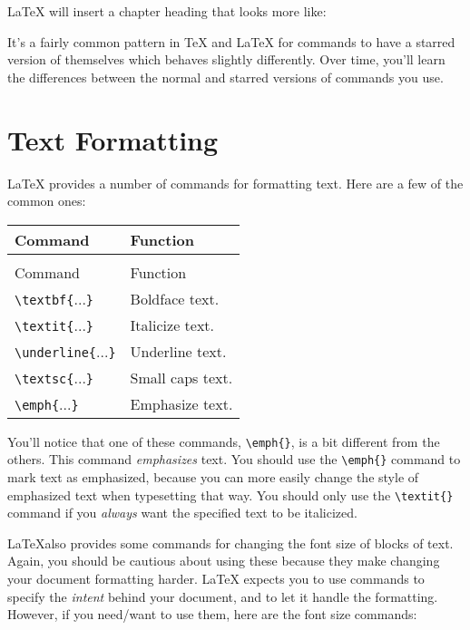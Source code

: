 
\LaTeX{} will insert a chapter heading that looks more like:


It's a fairly common pattern in \TeX{} and \LaTeX{} for commands to have a starred
version of themselves which behaves slightly differently. Over time, you'll
learn the differences between the normal and starred versions of commands you use.

\section{Text Formatting} \label{sec:formatting}

\LaTeX{} provides a number of commands for formatting text. Here are a few of
the common ones:

\begin{tabularx}{\linewidth}{|l|l|}
  \caption{Font Formatting Commands} \\
  \hline
  Command & Function \\
  \hline
  \endfirsthead
  \caption{Font Formatting Commands (continued)} \\
  \hline
  Command & Function \\
  \hline
  \endhead
  \texttt{\textbackslash{}textbf\{}...\texttt{\}}    & Boldface text. \\
  \texttt{\textbackslash{}textit\{}...\texttt{\}}    & Italicize text. \\
  \texttt{\textbackslash{}underline\{}...\texttt{\}} & Underline text. \\
  \texttt{\textbackslash{}textsc\{}...\texttt{\}}    & Small caps text. \\
  \texttt{\textbackslash{}emph\{}...\texttt{\}}      & Emphasize text. \\
  \hline
 \end{tabularx}

You'll notice that one of these commands, \texttt{\textbackslash{}emph\{\}},
is a bit different from the others. This command \emph{emphasizes} text. You
should use the \texttt{\textbackslash{}emph\{\}} command to mark text as
emphasized, because you can more easily change the style of emphasized text
when typesetting that way. You should only use the
\texttt{\textbackslash{}textit\{\}} command if you \emph{always} want the
specified text to be italicized.

\LaTeX also provides some commands for changing the font size of blocks of
text. Again, you should be cautious about using these because they make
changing your document formatting harder. \LaTeX{} expects you to use commands
to specify the \emph{intent} behind your document, and to let it handle the
formatting. However, if you need/want to use them, here are the font size
commands:

